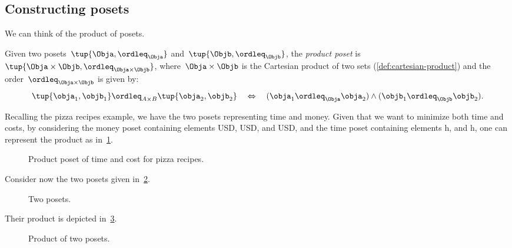 \subsection{Constructing posets}
We can think of the product of posets.

\begin{definition}
\label{def:productposet}
Given two posets~$\tup{\Obja, \ordleq_{\Obja}}$
and~$\tup{\Objb, \ordleq_{\Objb}}$, the \emph{product poset} is~$\tup{\Obja \times \Objb, \ordleq_{\Obja\times \Objb}}$, where~$\Obja \times \Objb$ is the Cartesian product of two sets (\cref{def:cartesian-product}) and the order~$\ordleq_{\Obja \times \Objb}$ is given by:
\begin{equation}
        \tup{\obja_1, \objb_1}
        \ordleq_{A\times B}
        \tup{\obja_2, \objb_2}
        \quad
        \Leftrightarrow
        \quad
        (\obja_1 \ordleq_\Obja \obja_2) \wedge
        (\objb_1 \ordleq_\Objb \objb_2).
    \end{equation}
\end{definition}
Recalling the pizza recipes example, we have the two posets representing time and money. Given that we want to minimize both time and costs, by considering the money poset containing elements \unit[1]{USD}, \unit[2]{USD}, and \unit[3]{USD}, and the time poset containing elements \unit[1]{h}, and \unit[2]{h}, one can represent the product as in~\cref{fig:productpizza}.

\begin{figure}[h!]
\begin{center}
\end{center}
\caption{Product poset of time and cost for pizza recipes.\label{fig:productpizza}}
\end{figure}


\begin{example}
Consider now the two posets given in~\cref{fig:composing_posets_1}.
\begin{figure}[h!]
\begin{center}
\end{center}
\caption{Two posets. \label{fig:composing_posets_1}}
\end{figure}
Their product is depicted in~\cref{fig:composing_posets_2}.
\begin{figure}[h!]
\begin{center}
\end{center}
\caption{Product of two posets. \label{fig:composing_posets_2}}
\end{figure}
\end{example}

